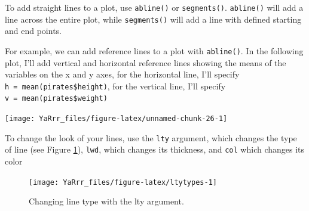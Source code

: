 \documentclass[]{book}
\newenvironment{Shaded}{\begin{snugshade}}{\end{snugshade}}
\newcommand{\KeywordTok}[1]{\textcolor[rgb]{0.13,0.29,0.53}{\textbf{{#1}}}}
\newcommand{\DataTypeTok}[1]{\textcolor[rgb]{0.13,0.29,0.53}{{#1}}}
\newcommand{\DecValTok}[1]{\textcolor[rgb]{0.00,0.00,0.81}{{#1}}}
\newcommand{\StringTok}[1]{\textcolor[rgb]{0.31,0.60,0.02}{{#1}}}
\newcommand{\CommentTok}[1]{\textcolor[rgb]{0.56,0.35,0.01}{\textit{{#1}}}}
\newcommand{\NormalTok}[1]{{#1}}
\theoremstyle{definition}
\theoremstyle{definition}
\theoremstyle{remark}
\begin{document}
To add straight lines to a plot, use \texttt{abline()} or
\texttt{segments()}. \texttt{abline()} will add a line across the entire
plot, while \texttt{segments()} will add a line with defined starting
and end points.

For example, we can add reference lines to a plot with
\texttt{abline()}. In the following plot, I'll add vertical and
horizontal reference lines showing the means of the variables on the x
and y axes, for the horizontal line, I'll specify
\texttt{h\ =\ mean(pirates\$height)}, for the vertical line, I'll
specify \texttt{v\ =\ mean(pirates\$weight)}

\begin{Shaded}
\end{Shaded}

\begin{center}\texttt{[image: YaRrr\_files/figure-latex/unnamed-chunk-26-1]} \end{center}

To change the look of your lines, use the \texttt{lty} argument, which
changes the type of line (see Figure \ref{fig:ltytypes}), \texttt{lwd},
which changes its thickness, and \texttt{col} which changes its color

\begin{figure}

{\centering \texttt{[image: YaRrr\_files/figure-latex/ltytypes-1]} 

}

\caption{Changing line type with the lty argument.}\label{fig:ltytypes}
\end{figure}
\end{document}
